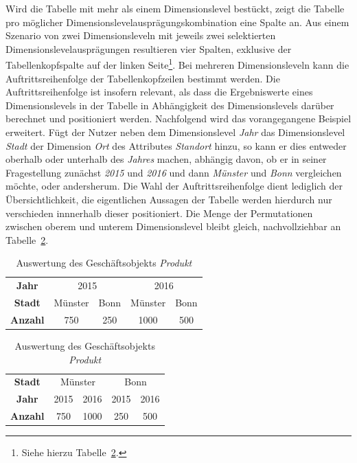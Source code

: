 \documentclass[
  language=german, %
  type=bachelor,%
  ngerman
]{isthesis}
\begin{document}
\begin{content}
  Wird die Tabelle mit mehr als einem Dimensionslevel bestückt, zeigt die
  Tabelle pro möglicher Dimensionslevelausprägungskombination eine Spalte an.
  Aus einem Szenario von zwei Dimensionsleveln mit jeweils zwei selektierten
  Dimensionslevelausprägungen resultieren vier Spalten, exklusive der
  Tabellenkopfspalte auf der linken Seite\footnote{Siehe hierzu Tabelle~\ref{table:auftrittsreihenfolge}.}. Bei mehreren Dimensionsleveln
  kann die Auftrittsreihenfolge der Tabellenkopfzeilen bestimmt werden. Die
  Auftrittsreihenfolge ist insofern relevant, als dass die Ergebniswerte eines
  Dimensionslevels in der Tabelle in Abhängigkeit des Dimensionslevels darüber
  berechnet und positioniert werden. Nachfolgend wird das vorangegangene
  Beispiel erweitert. Fügt der Nutzer neben dem Dimensionslevel \textit{Jahr}
  das Dimensionslevel \textit{Stadt} der Dimension \textit{Ort} des
  Attributes \textit{Standort} hinzu, so kann er dies entweder oberhalb oder
  unterhalb des \textit{Jahres} machen, abhängig davon, ob er in seiner
  Fragestellung zunächst \textit{2015} und \textit{2016} und dann \textit{Münster}
  und \textit{Bonn} vergleichen möchte, oder andersherum. Die Wahl der
  Auftrittsreihenfolge dient lediglich der Übersichtlichkeit, die eigentlichen
  Aussagen der Tabelle werden hierdurch nur verschieden innnerhalb dieser positioniert.
  Die Menge der Permutationen zwischen oberem und unterem Dimensionslevel
  bleibt gleich, nachvollziehbar an Tabelle~\ref{table:auftrittsreihenfolge}.
  
  \begin{table}
    \footnotesize
    \begin{tabular}{c c c c c}
      \textbf{Jahr} & \multicolumn{2}{c}{2015} & \multicolumn{2}{c}{2016} \\
      \cmidrule(lr){2-3}\cmidrule(lr){4-5}
      \textbf{Stadt} & Münster & Bonn & Münster & Bonn \\
      \toprule
      \textbf{Anzahl} & 750 & 250 & 1000 & 500\\
    \end{tabular}
    \hfill
    \begin{tabular}{c c c c c}
      \textbf{Stadt} & \multicolumn{2}{c}{Münster} & \multicolumn{2}{c}{Bonn} \\
      \cmidrule(lr){2-3}\cmidrule(lr){4-5}
      \textbf{Jahr} & 2015 & 2016 & 2015 & 2016 \\
      \toprule
      \textbf{Anzahl} & 750 & 1000 & 250 & 500 \\
    \end{tabular}
    \caption{Auswertung des Geschäftsobjekts \textit{Produkt}}\label{table:auftrittsreihenfolge}
  \end{table}


\end{content}
\end{document}
